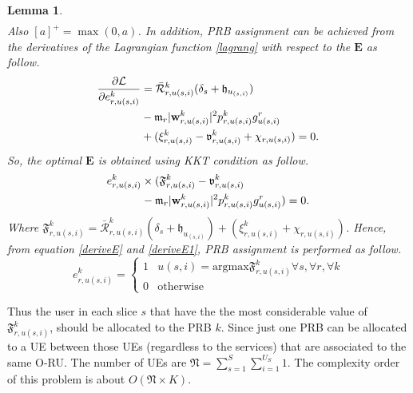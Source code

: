 \documentclass[conference]{IEEEtran}
\newtheorem{lemma}{Lemma}
\begin{document}
\begin{lemma}
\begin{equation}
\begin{split}
\end{split}
\end{equation}
Also $[a]^+ = \max(0,a)$.
In addition, PRB assignment can be achieved from the derivatives of the Lagrangian function \eqref{lagrang} with respect to the $\boldsymbol{E}$ as follow.
\begin{equation}\label{deriveE}
\begin{split}
\dfrac{\partial\mathcal{L}}{\partial e_{r,u(s,i)}^{k}} &= \mathcal{\bar{R}}_{r,u(s,i)}^{k}(\delta_s+\mathfrak{h}_{u_{(s,i)}})\\
&- \mathfrak{m}_{r}|\bold{w}_{r,u(s,i)}^{k}|^2 p_{r,u(s,i)}^{k} g_{u(s,i)}^r\\
&+( \xi^{k}_{r,u(s,i)}-\mathfrak{v}^{k}_{r,u(s,i)} +\chi_{r,u(s,i)})=0.\\
\end{split}
\end{equation}
So, the optimal $\boldsymbol{E}$ is obtained using KKT condition as follow.
\begin{equation}\label{deriveE1}
\begin{split}
e_{r,u(s,i)}^{k} &\times (\mathfrak{F}^{k}_{r,u(s,i)} -\mathfrak{v}^{k}_{r,u(s,i)}\\
& - \mathfrak{m}_{r}|\bold{w}_{r,u(s,i)}^{k}|^2 p_{r,u(s,i)}^{k} g_{u(s,i)}^r ) = 0.\\
\end{split}
\end{equation}
Where $\mathfrak{F}^{k}_{r,u(s,i)} =\mathcal{\bar{R}}_{r,u(s,i)}^{k}(\delta_s+\mathfrak{h}_{u_{(s,i)}})+( \xi^{k}_{r,u(s,i)} +\chi_{r,u(s,i)}) $.
Hence, from equation \eqref{deriveE} and \eqref{deriveE1}, PRB assignment is performed as follow.
\begin{equation}
e_{r,u(s,i)}^{k} = 
  \begin{cases}
      1 & u(s,i) = \text{argmax} \mathfrak{F}^{k}_{r,u(s,i)} \forall s, \forall r, \forall k\\
      0 & \text{otherwise}
    \end{cases}
\end{equation}
\end{lemma}
Thus the user in each slice $s$ that have the the most considerable value of $\mathfrak{F}^{k}_{r,u(s,i)}$, should be allocated to the PRB $k$. Since just one PRB can be allocated to a UE between those UEs (regardless to the services) that are associated to the same O-RU.
The number of UEs are $\mathfrak{N} = \sum_{s=1}^{S}\sum_{i=1}^{U_S}1$.
The complexity order of this problem is about $O(\mathfrak{N} \times K)$.
\end{document}
